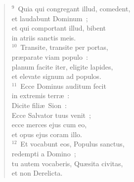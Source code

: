 \begin{flushleft}
\begin{verse}
${}^{9}$~Quia qui congregant illud, comedent,\\ et laudabunt Dominum~;\\ et qui comportant illud, bibent\\ in atriis sanctis meis.\\
${}^{10}$~Transite, transite per portas,\\ pr\ae parate viam populo~:\\ planum facite iter, eligite lapides,\\ et elevate signum ad populos.\\
${}^{11}$~Ecce Dominus auditum fecit\\ in extremis terr\ae~:\\ Dicite fili\ae\ Sion~:\\ Ecce Salvator tuus venit~;\\ ecce merces ejus cum eo,\\ et opus ejus coram illo.\\
${}^{12}$~Et vocabunt eos, Populus sanctus,\\ redempti a Domino~;\\ tu autem vocaberis, Qu\ae sita civitas,\\ et non Derelicta.\end{verse}\end{flushleft}


